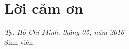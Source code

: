 \thispagestyle{empty}
\chapter*{Lời cảm ơn}
\blindtext[2]





\vspace{1cm}
\begin{minipage}{0.3\textwidth}
\hspace{\fill}
\end{minipage}
\begin{minipage}{0.81\textwidth}
\centering 
{\it Tp. Hồ Chí Minh, tháng 05, năm 2016}	\\
Sinh viên 	
\vskip 1.5cm	

\end{minipage}


